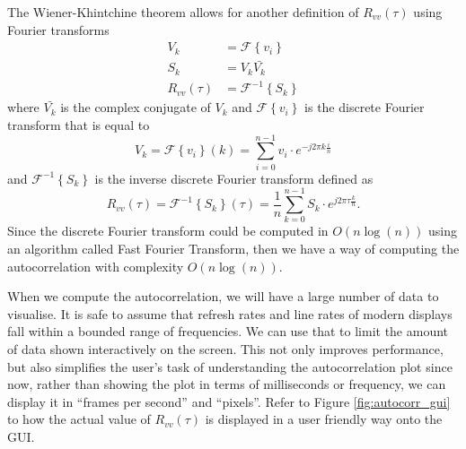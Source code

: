 \documentclass[a4paper,12pt,twoside,openright]{report}
\begin{document}
The Wiener-Khintchine theorem \cite{wiener1964} allows for another definition of $R_{vv}(\tau)$ using Fourier transforms
\begin{equation}
	\begin{aligned}
	V_{k} & = \mathcal{F} \left\{ v_{i} \right\} \\
	S_{k} & = V_{k} \bar{V_{k}} \\
	R_{vv}(\tau) & = \mathcal{F}^{-1} \left\{ S_{k} \right\}
	\end{aligned}
\end{equation}
where $\bar{V_{k}}$ is the complex conjugate of $V_{k}$ and $\mathcal{F} \left\{ v_{i} \right\}$ is the discrete Fourier transform that is equal to
$$V_{k}=\mathcal{F} \left\{ v_{i} \right\} (k) = \sum_{i = 0}^{n-1} v_{i} \cdot e^{- j 2 \pi k \frac{i}{n}} $$
and $\mathcal{F}^{-1} \left\{ S_{k} \right\}$ is the inverse discrete Fourier transform defined as
$$R_{vv}(\tau)=\mathcal{F}^{-1} \left\{ S_{k} \right\} (\tau) = \frac{1}{n} \sum_{k = 0}^{n-1} S_{k} \cdot e^{j 2 \pi \tau \frac{k}{n}}. $$
Since the discrete Fourier transform could be computed in $O(n \log(n))$ using an algorithm called Fast Fourier Transform, then we have a way of computing the autocorrelation with complexity $O(n \log(n))$.

When we compute the autocorrelation, we will have a large number of data to visualise. It is safe to assume that refresh rates and line rates of modern displays fall within a bounded range of frequencies. We can use that to limit the amount of data shown interactively on the screen. This not only improves performance, but also simplifies the user's task of understanding the autocorrelation plot since now, rather than showing the plot in terms of milliseconds or frequency, we can display it in ``frames per second'' and ``pixels''. Refer to Figure \ref{fig:autocorr_gui} to how the actual value of $R_{vv}(\tau)$ is displayed in a user friendly way onto the GUI.
\end{document}
